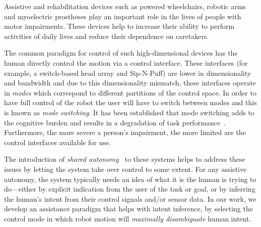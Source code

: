 \documentclass[conference]{IEEEtran}
\begin{document}
Assistive and rehabilitation devices such as powered wheelchairs, robotic arms and myoelectric prostheses play an important role in the lives of people with motor impairments. These devices help to increase their ability to perform activities of daily lives and reduce their dependence on caretakers.

The common paradigm for control of such high-dimensional devices has the human directly control the motion via a control interface.  These interfaces (for example,  a switch-based head array and Sip-N-Puff) are lower in dimensionality and bandwidth and due to this dimensionality mismatch, these interfaces operate in \textit{modes} which correspond to different partitions of the control space. In order to have full control of the robot the user will have to switch between modes and this is known as \textit{mode switching}. 
It has been established that mode switching adds to the cognitive burden and results in a degradation of task performance~\cite{monsell2003task}.  Furthermore, the more severe a person's impairment, the more limited are the control interfaces available for use.

 The introduction of \textit{shared autonomy}~\cite{volosyak2005rehabilitation} to these systems helps to address these issues by letting the system take over control to some extent.
For any assistive autonomy, the system typically needs an idea of what it is the human is trying to do---either by explicit indication from the user of the task or goal, or by inferring the human's intent from their control signals and/or sensor data. In our work, we develop an assistance paradigm that helps with intent inference, by selecting the control mode in which robot motion will \textit{maximally disambiguate} human intent. 
\end{document}
